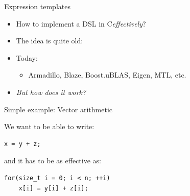 \documentclass[@BEAMER_OPTIONS@]{beamer}
\newcommand{\CXX}{{\rm C}\plusplus}
\begin{document}
\note{}

\begin{frame}{Expression templates}
    \begin{itemize}
        \item How to implement a DSL in \CXX \emph{effectively}?
            \vspace{\baselineskip}
        \item The idea is quite old:
        \item Today:
            \begin{itemize}
                \item Armadillo, Blaze, Boost.uBLAS, Eigen, MTL, etc.
            \end{itemize}
            \vspace{\baselineskip}
        \item \alert{\emph{But how does it work?}}
    \end{itemize}
\end{frame}

\note{ }

\begin{frame}[fragile]{Simple example: Vector arithmetic}
    \begin{exampleblock}{We want to be able to write:}
        \begin{lstlisting}
x = y + z;
        \end{lstlisting}
    \end{exampleblock}

    \begin{exampleblock}{and it has to be as effective as:}
        \begin{lstlisting}
for(size_t i = 0; i < n; ++i)
    x[i] = y[i] + z[i];
        \end{lstlisting}
    \end{exampleblock}
\end{frame}
\end{document}
